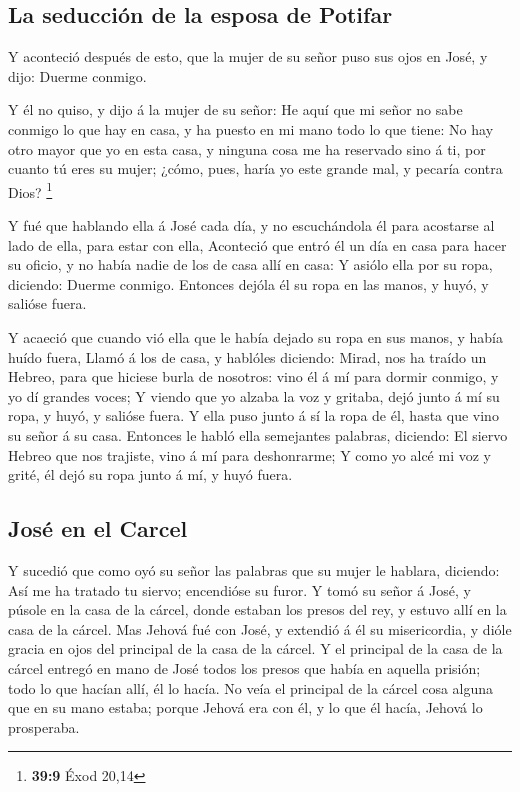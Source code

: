 \hypertarget{la-seducciuxf3n-de-la-esposa-de-potifar}{%
\subsection{La seducción de la esposa de
Potifar}\label{la-seducciuxf3n-de-la-esposa-de-potifar}}

 Y aconteció después de esto, que la mujer de su señor
puso sus ojos en José, y dijo: Duerme conmigo.

 Y él no quiso, y dijo á la mujer de su señor: He aquí que
mi señor no sabe conmigo lo que hay en casa, y ha puesto en mi mano todo
lo que tiene:  No hay otro mayor que yo en esta casa, y
ninguna cosa me ha reservado sino á ti, por cuanto tú eres su mujer;
¿cómo, pues, haría yo este grande mal, y pecaría contra Dios?
\footnote{\textbf{39:9} Éxod 20,14}

 Y fué que hablando ella á José cada día, y no
escuchándola él para acostarse al lado de ella, para estar con ella,
 Aconteció que entró él un día en casa para hacer su
oficio, y no había nadie de los de casa allí en casa:  Y
asiólo ella por su ropa, diciendo: Duerme conmigo. Entonces dejóla él su
ropa en las manos, y huyó, y salióse fuera.

 Y acaeció que cuando vió ella que le había dejado su
ropa en sus manos, y había huído fuera,  Llamó á los de
casa, y hablóles diciendo: Mirad, nos ha traído un Hebreo, para que
hiciese burla de nosotros: vino él á mí para dormir conmigo, y yo dí
grandes voces;  Y viendo que yo alzaba la voz y gritaba,
dejó junto á mí su ropa, y huyó, y salióse fuera.  Y ella
puso junto á sí la ropa de él, hasta que vino su señor á su casa.
 Entonces le habló ella semejantes palabras, diciendo: El
siervo Hebreo que nos trajiste, vino á mí para deshonrarme;
 Y como yo alcé mi voz y grité, él dejó su ropa junto á
mí, y huyó fuera.

\hypertarget{josuxe9-en-el-carcel}{%
\subsection{José en el Carcel}\label{josuxe9-en-el-carcel}}

 Y sucedió que como oyó su señor las palabras que su
mujer le hablara, diciendo: Así me ha tratado tu siervo; encendióse su
furor.  Y tomó su señor á José, y púsole en la casa de la
cárcel, donde estaban los presos del rey, y estuvo allí en la casa de la
cárcel.  Mas Jehová fué con José, y extendió á él su
misericordia, y dióle gracia en ojos del principal de la casa de la
cárcel.  Y el principal de la casa de la cárcel entregó
en mano de José todos los presos que había en aquella prisión; todo lo
que hacían allí, él lo hacía.  No veía el principal de la
cárcel cosa alguna que en su mano estaba; porque Jehová era con él, y lo
que él hacía, Jehová lo prosperaba.

